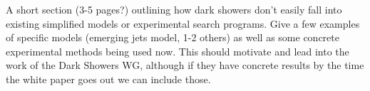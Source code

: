 A short section (3-5 pages?) outlining how dark showers don't easily fall into existing simplified models or experimental search programs. Give a few examples of specific models (emerging jets model, 1-2 others) as well as some concrete experimental methods being used now. This should motivate and lead into the work of the Dark Showers WG, although if they have concrete results by the time the white paper goes out we can include those.